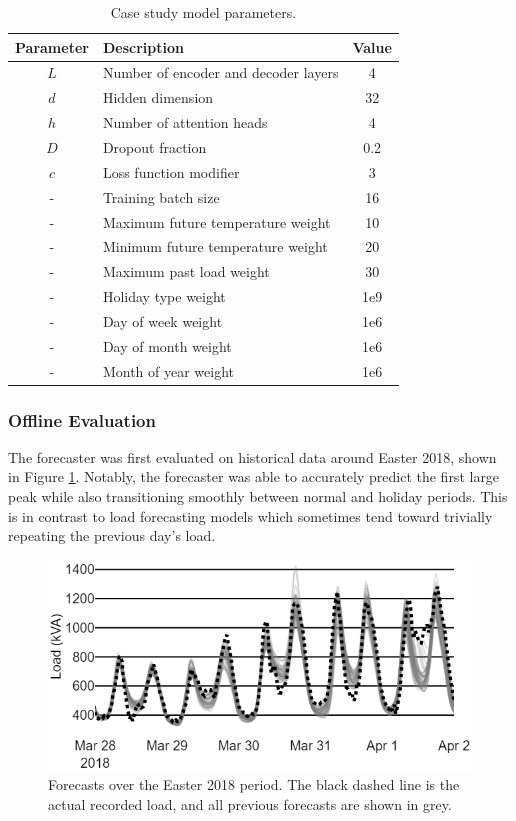 \begin{table}[htbp]
	\caption{Case study model parameters.}
	\begin{center}
		\begin{tabular}{clc}
			\textbf{Parameter}&\textbf{Description}&\textbf{Value} \\
			\hline
			$L$ & Number of encoder and decoder layers & 4 \\
			$d$ & Hidden dimension & 32 \\
			$h$ & Number of attention heads & 4 \\
			$D$ & Dropout fraction & 0.2 \\
			$c$ & Loss function modifier & 3 \\
			-   & Training batch size & 16 \\
			\hline
			-   & Maximum future temperature weight & 10 \\
			-   & Minimum future temperature weight & 20 \\
			-   & Maximum past load weight & 30 \\
			-   & Holiday type weight & 1e9 \\
			-   & Day of week weight & 1e6 \\
			-   & Day of month weight & 1e6 \\
			-   & Month of year weight & 1e6 \\
			
		\end{tabular}
		\label{table:parameters}
	\end{center}
\end{table}

\subsubsection{Offline Evaluation}

The forecaster was first evaluated on historical data around Easter 2018, shown in Figure \ref{fig:easter_forecasts}.
Notably, the forecaster was able to accurately predict the first large peak while also transitioning smoothly between normal and holiday periods.
This is in contrast to load forecasting models which sometimes tend toward trivially repeating the previous day's load.


\begin{figure}[htbp]
	\centerline{\includegraphics[width=.65\textwidth]{images/easter_2018_all_forecast.png}}
	\caption{Forecasts over the Easter 2018 period.
		The black dashed line is the actual recorded load, and all previous forecasts are shown in grey.}
	\label{fig:easter_forecasts}
\end{figure}

